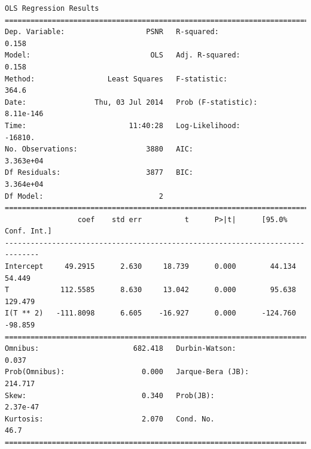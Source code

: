 \documentclass[11pt]{article}
\theoremstyle{definition}
\begin{document}
{\begin{lstlisting}[caption = Time Series 2 - Non-Local Means OLS Model - T Only, label = {nlmeanst2}]
                            OLS Regression Results                            
==============================================================================
Dep. Variable:                   PSNR   R-squared:                       0.158
Model:                            OLS   Adj. R-squared:                  0.158
Method:                 Least Squares   F-statistic:                     364.6
Date:                Thu, 03 Jul 2014   Prob (F-statistic):          8.11e-146
Time:                        11:40:28   Log-Likelihood:                -16810.
No. Observations:                3880   AIC:                         3.363e+04
Df Residuals:                    3877   BIC:                         3.364e+04
Df Model:                           2                                         
==============================================================================
                 coef    std err          t      P>|t|      [95.0% Conf. Int.]
------------------------------------------------------------------------------
Intercept     49.2915      2.630     18.739      0.000        44.134    54.449
T            112.5585      8.630     13.042      0.000        95.638   129.479
I(T ** 2)   -111.8098      6.605    -16.927      0.000      -124.760   -98.859
==============================================================================
Omnibus:                      682.418   Durbin-Watson:                   0.037
Prob(Omnibus):                  0.000   Jarque-Bera (JB):              214.717
Skew:                           0.340   Prob(JB):                     2.37e-47
Kurtosis:                       2.070   Cond. No.                         46.7
==============================================================================
\end{lstlisting}

}
\end{document}

